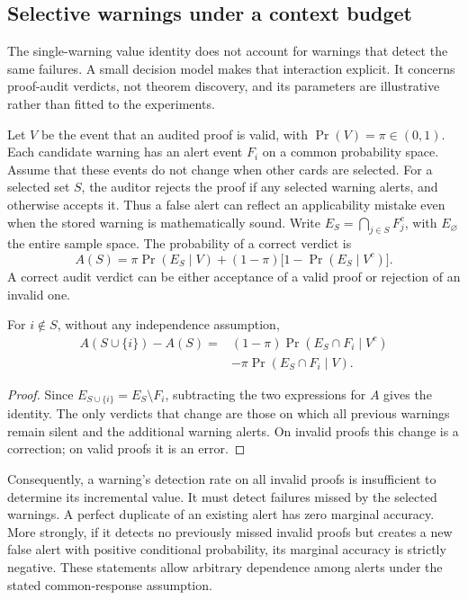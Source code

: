 \subsection{Selective warnings under a context budget}
\label{sec:warningbudget}

The single-warning value identity does not account for warnings that detect the same failures. A small decision model makes that interaction explicit. It concerns proof-audit verdicts, not theorem discovery, and its parameters are illustrative rather than fitted to the experiments.

Let $V$ be the event that an audited proof is valid, with $\Pr(V)=\pi\in(0,1)$. Each candidate warning has an alert event $F_i$ on a common probability space. Assume that these events do not change when other cards are selected. For a selected set $S$, the auditor rejects the proof if any selected warning alerts, and otherwise accepts it. Thus a false alert can reflect an applicability mistake even when the stored warning is mathematically sound. Write $E_S=\bigcap_{j\in S}F_j^c$, with $E_\varnothing$ the entire sample space. The probability of a correct verdict is
\[
 A(S)=\pi\Pr(E_S\mid V)
 +(1-\pi)\bigl[1-\Pr(E_S\mid V^c)\bigr].
\]
A correct audit verdict can be either acceptance of a valid proof or rejection of an invalid one.

\begin{proposition}
For $i\notin S$, without any independence assumption,
\begin{align*}
 A(S\cup\{i\})-A(S)
 ={}&(1-\pi)\Pr(E_S\cap F_i\mid V^c)\\
 &-\pi\Pr(E_S\cap F_i\mid V).
\end{align*}
\end{proposition}
\begin{proof}
Since $E_{S\cup\{i\}}=E_S\setminus F_i$, subtracting the two expressions for $A$ gives the identity. The only verdicts that change are those on which all previous warnings remain silent and the additional warning alerts. On invalid proofs this change is a correction; on valid proofs it is an error.
\end{proof}

Consequently, a warning's detection rate on all invalid proofs is insufficient to determine its incremental value. It must detect failures missed by the selected warnings. A perfect duplicate of an existing alert has zero marginal accuracy. More strongly, if it detects no previously missed invalid proofs but creates a new false alert with positive conditional probability, its marginal accuracy is strictly negative. These statements allow arbitrary dependence among alerts under the stated common-response assumption.

